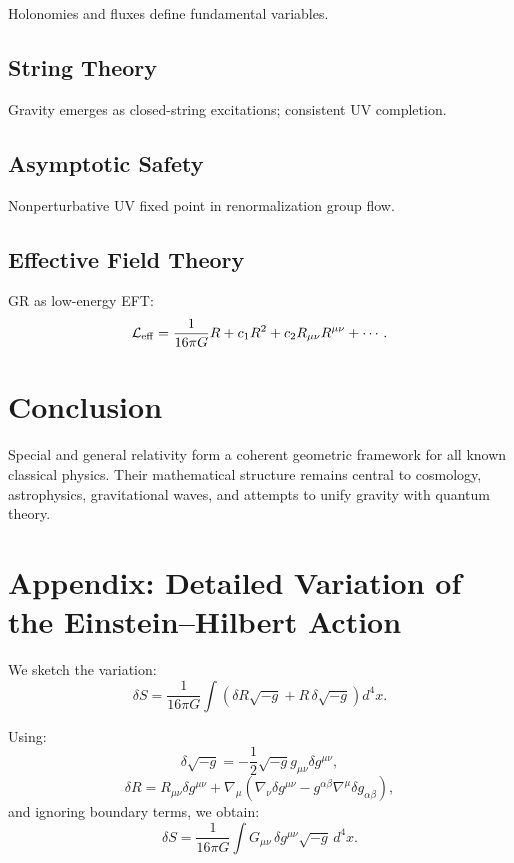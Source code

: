 \documentclass[12pt]{article}
\begin{document}
Holonomies and fluxes define fundamental variables.

\subsection{String Theory}

Gravity emerges as closed-string excitations; consistent UV completion.

\subsection{Asymptotic Safety}

Nonperturbative UV fixed point in renormalization group flow.

\subsection{Effective Field Theory}

GR as low-energy EFT:
\[
\mathcal{L}_{\rm eff}
= \frac{1}{16\pi G}R + c_1R^2 + c_2 R_{\mu\nu}R^{\mu\nu} + \cdots.
\]

\section{Conclusion}

Special and general relativity form a coherent geometric framework for all 
known classical physics. Their mathematical structure remains central to 
cosmology, astrophysics, gravitational waves, and attempts to unify 
gravity with quantum theory.

\appendix

\section{Appendix: Detailed Variation of the Einstein--Hilbert Action}

We sketch the variation:
\[
\delta S = \frac{1}{16\pi G}\int \left(\delta R \sqrt{-g}
+ R\,\delta\sqrt{-g}\right) d^4x.
\]

Using:
\[
\delta\sqrt{-g} = -\frac12\sqrt{-g}g_{\mu\nu}\delta g^{\mu\nu},
\]
\[
\delta R = R_{\mu\nu}\delta g^{\mu\nu} 
+ \nabla_\mu(\nabla_\nu \delta g^{\mu\nu} - g^{\alpha\beta}\nabla^\mu\delta g_{\alpha\beta}),
\]
and ignoring boundary terms, we obtain:
\[
\delta S = \frac{1}{16\pi G}\int G_{\mu\nu}\,\delta g^{\mu\nu} \sqrt{-g}\, d^4x.
\]
\end{document}
